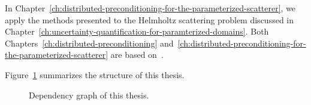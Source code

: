 In Chapter~\ref{ch:distributed-preconditioning-for-the-parameterized-scatterer}, we apply the methods presented to the Helmholtz scattering problem discussed in Chapter~\ref{ch:uncertainty-quantification-for-paramterized-domains}.
Both Chapters~\ref{ch:distributed-preconditioning} and~\ref{ch:distributed-preconditioning-for-the-parameterized-scatterer} are based on~\cite{vanharten2025a}.

Figure~\ref{fig:chapters} summarizes the structure of this thesis.
\begin{figure}
    \centering
    \caption{Dependency graph of this thesis.}
    \label{fig:chapters}
\end{figure}